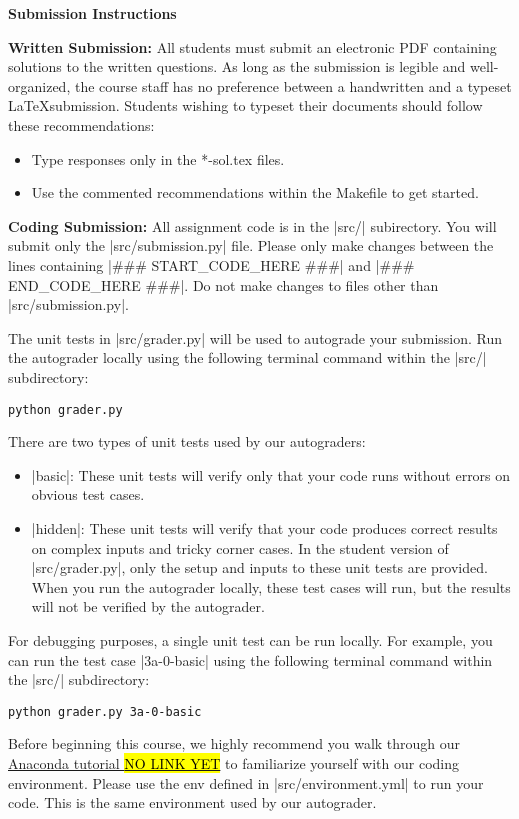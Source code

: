 {\bf Submission Instructions}

{\bf Written Submission:}
All students must submit an electronic PDF containing solutions to the written
questions. As long as the submission is legible and well-organized, the course
staff has no preference between a handwritten and a typeset \LaTeX submission.
Students wishing to typeset their documents should follow these recommendations:
\begin{itemize}
  \item Type responses only in the *-sol.tex files.
  \item Use the commented recommendations within the Makefile to get started.
\end{itemize}

{\bf Coding Submission:}
All assignment code is in the |src/| subirectory.  You will submit only the
|src/submission.py| file.  Please only make changes between the lines containing
|### START_CODE_HERE ###| and |### END_CODE_HERE ###|. Do not make changes to
files other than |src/submission.py|.

The unit tests in |src/grader.py| will be used to autograde your submission.
Run the autograder locally using the following terminal command within the
|src/| subdirectory:
\begin{lstlisting}
python grader.py
\end{lstlisting}

There are two types of unit tests used by our autograders:
\begin{itemize}
  \item |basic|:  These unit tests will verify only that your code runs without
  errors on obvious test cases.
  \item |hidden|: These unit tests will verify that your code produces correct
  results on complex inputs and tricky corner cases.  In the student version of
  |src/grader.py|, only the setup and inputs to these unit tests are provided.
  When you run the autograder locally, these test cases will run, but the
  results will not be verified by the autograder.
\end{itemize}

For debugging purposes, a single unit test can be run locally.  For example, you
can run the test case |3a-0-basic| using the following terminal command within
the |src/| subdirectory:
\begin{lstlisting}
python grader.py 3a-0-basic
\end{lstlisting}

Before beginning this course, we highly recommend you walk through our
\href{nolink}{Anaconda tutorial \hl{NO LINK YET}} to familiarize yourself with
our coding environment.  Please use the env defined in |src/environment.yml|
to run your code.  This is the same environment used by our autograder.

